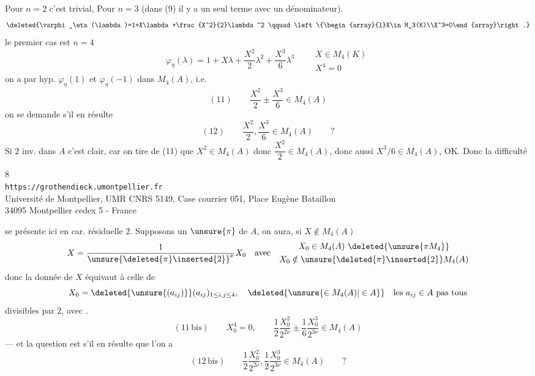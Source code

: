 Pour $n=2$ c'est trivial, Pour $n=3$ \uline{}
(dans (9) il y a un seul terme avec un dénominateur).
\[
\deleted{\varphi_\eta(\lambda)=1+X\lambda+\frac{X^2}{2}\lambda^2
\qquad\left\{\begin{array}{l}X\in M_3(K)\\X^3=0\end{array}\right.}
\]
le premier cas  est $n=4$
\[
\varphi_\eta(\lambda)=1+X\lambda+\frac{X^2}{2}\lambda^2+
\frac{X^3}{6}\lambda^3
\qquad\begin{array}{l}X\in M_4(K)\\X^4=0\end{array}
\]
on a par hyp. $\varphi_\eta(1)$ et $\varphi_\eta(-1)$ dans $M_4(A)$,
i.e.
\[
(11)\qquad \frac{X^2}{2}\mathbin{\pm}\frac{X^3}{6}\in M_4(A)
\]
on se demande s'il en résulte
\[
(12)\qquad \frac{X^2}{2},\frac{X^3}{6}\in M_4(A)\qquad ?
\]
Si $2$ inv. dans $A$ c'est clair, car on tire de (11) que $X^2\in M_4(A)$
donc $\dfrac{X^2}{2}\in M_4(A)$, donc aussi $X^3/6\in M_4(A)$, OK.
Donc la difficulté

\begin{center}
\small
8\\
\texttt{https://grothendieck.umontpellier.fr}\\
Université de Montpellier, UMR CNRS 5149, Case courrier 051, Place Eugène Bataillon\\
34095 Montpellier cedex 5 - France
\end{center}

se présente ici en car. résiduelle 2.  Supposons \deleted{\unsure{$\pi$}}  un  $\unsure{\pi}$ de $A$, on aura, si $X\notin M_4(A)$
\[
X=\frac{1}{\unsure{\deleted{\pi}\inserted{2}}^{\nu}}X_0
\quad\text{avec}\quad
\begin{gathered}
X_0\in M_4(A)\ \deleted{\unsure{\pi M_4}}\\
X_0\notin \unsure{\deleted{\pi}\inserted{2}}M_4(A)
\end{gathered}
\]
donc  la donnée de $X$ équivaut à celle de
\[
X_0=\deleted{\unsure{(a_{ij})}}(a_{ij})_{1\leq i,j\leq4},\quad
\deleted{\unsure{\in M_4(A)|\in A}}\quad\text{les }a_{ij}\in A\text{ pas tous}
\]
divisibles par 2, avec .
\[
(11\,\text{bis})\qquad X_0^4=0,\qquad
\frac12\frac{X_0^2}{2^{2\nu}}\pm\frac16\frac{X_0^3}{2^{3\nu}}\in M_4(A)
\]
--- et la question est s'il en résulte que l'on a
\[
(12\,\text{bis})\qquad
\frac12\frac{X_0^2}{2^{2\nu}},\frac12\frac{X_0^3}{2^{3\nu}}\in M_4(A)\qquad ?
\]


